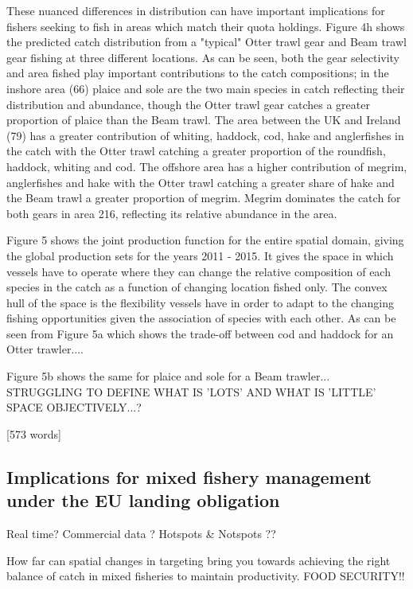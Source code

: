\documentclass{nature}
\begin{document}
\begin{linenumbers}
These nuanced differences in distribution can have important implications for
fishers seeking to fish in areas which match their quota holdings. Figure 4h
shows the predicted catch distribution from a "typical" Otter trawl gear and
Beam trawl gear fishing at three different locations. As can be seen, both the
gear selectivity and area fished play important contributions to the catch
compositions; in the inshore area (66) plaice and sole are the two main species
in catch reflecting their distribution and abundance, though the Otter trawl
gear catches a greater proportion of plaice than the Beam trawl. The area
between the UK and Ireland (79) has a greater contribution of whiting, haddock,
cod, hake and anglerfishes in the catch with the Otter trawl catching a greater
proportion of the roundfish, haddock, whiting and cod. The offshore area has a
higher contribution of megrim, anglerfishes and hake with the Otter trawl
catching a greater share of hake and the Beam trawl a greater proportion of
megrim. Megrim dominates the catch for both gears in area 216, reflecting its
relative abundance in the area.

Figure 5 shows the joint production function for the entire spatial domain,
giving the global production sets for the years 2011 - 2015. It gives the space
in which vessels have to operate where they can change the relative composition
of each species in the catch as a function of changing location fished only.
The convex hull of the space is the flexibility vessels have in order to adapt
to the changing fishing opportunities given the association of species with
each other\cite{Reimer2017}. As can be seen from Figure 5a which shows the
trade-off between cod and haddock for an Otter trawler....

Figure 5b shows the same for plaice and sole for a Beam trawler...
STRUGGLING TO DEFINE WHAT IS 'LOTS' AND WHAT IS 'LITTLE' SPACE OBJECTIVELY...?

[573 words]

\subsection{Implications for mixed fishery management under the EU landing
	obligation}


Real time?  Commercial data ?  Hotspots \& Notspots ??

How far can spatial changes in targeting bring you towards achieving the right
balance of catch in mixed fisheries to maintain productivity. FOOD SECURITY!!


\end{linenumbers}
\end{document}
